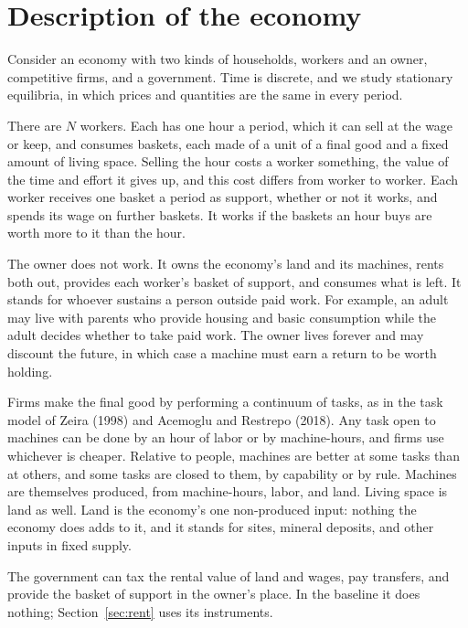 \documentclass[12pt]{article}
\theoremstyle{plain}
\theoremstyle{definition}
\theoremstyle{remark}
\begin{document}
\section{Description of the economy}\label{sec:description}

Consider an economy with two kinds of households, workers and an owner, competitive firms, and a
government. Time is discrete, and we study stationary equilibria, in which prices and quantities
are the same in every period.

There are $N$ workers. Each has one hour a period, which it can sell at the wage or keep, and
consumes baskets, each made of a unit of a final good and a fixed amount of living space. Selling
the hour costs a worker something, the value of the time and effort it gives up, and this cost
differs from worker to worker. Each worker receives one basket a period as support, whether or not
it works, and spends its wage on further baskets. It works if the baskets an hour buys are worth
more to it than the hour.

The owner does not work. It owns the economy's land and its machines, rents both out, provides each
worker's basket of support, and consumes what is left. It stands for whoever sustains a person
outside paid work. For example, an adult may live with parents who provide housing and basic
consumption while the adult decides whether to take paid work. The owner lives forever and
may discount the future, in which case a machine must earn a return to be worth holding.

Firms make the final good by performing a continuum of tasks, as in the task model of Zeira (1998)
and Acemoglu and Restrepo (2018). Any task open to machines can be done
by an hour of labor or by machine-hours, and firms use whichever is cheaper. Relative to people,
machines are better at some tasks than at others, and some tasks are closed to them, by capability
or by rule. Machines are themselves produced, from machine-hours, labor, and land. Living space is
land as well. Land is the economy's one non-produced input: nothing the economy does adds to it,
and it stands for sites, mineral deposits, and other inputs in fixed supply.

The government can tax the rental value of land and wages, pay transfers, and provide the basket of support in the owner's place. In the baseline it does nothing;
Section~\ref{sec:rent} uses its instruments.
\end{document}
